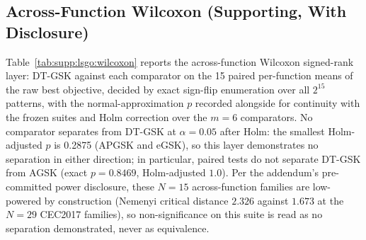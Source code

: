 \documentclass[algorithms,article,submit,moreauthors,pdftex]{Definitions/mdpi}
\newcommand{\dtgsk}{DT-GSK}
\newcommand{\agsk}{AGSK}
\newcommand{\apgsk}{APGSK}
\newcommand{\egsk}{eGSK}
\begin{document}
\subsection{Across-Function Wilcoxon (Supporting, With Disclosure)}\label{sec:supp:lsgo:pairwise}

Table~\ref{tab:supp:lsgo:wilcoxon} reports the across-function Wilcoxon
signed-rank layer: \dtgsk{} against each comparator on the 15 paired
per-function means of the raw best objective, decided by exact sign-flip
enumeration over all $2^{15}$ patterns, with the normal-approximation $p$
recorded alongside for continuity with the frozen suites and Holm
correction over the $m = 6$ comparators.  No comparator separates from
\dtgsk{} at $\alpha = 0.05$ after Holm: the smallest Holm-adjusted
$p$ is 0.2875 (\apgsk{} and \egsk{}), so this layer demonstrates no
separation in either direction; in particular, paired tests do not
separate \dtgsk{} from \agsk{} (exact $p = 0.8469$, Holm-adjusted $1.0$).
Per the addendum's pre-committed power disclosure, these $N = 15$
across-function families are low-powered by construction (Nemenyi
critical distance $2.326$ against $1.673$ at the $N = 29$ CEC2017
families), so non-significance on this suite is read as no separation
demonstrated, never as equivalence.
\end{document}

